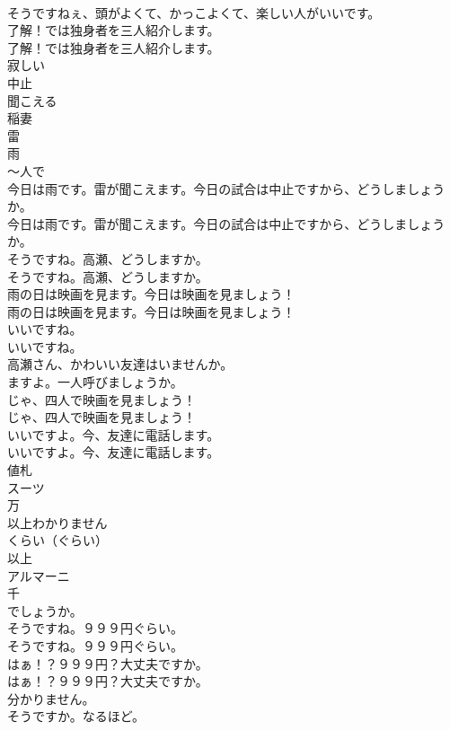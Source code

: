 \documentclass[8pt]{extreport}
\begin{document}
\begin{CJK}{UTF8}{min}
\\	そうですねぇ、頭がよくて、かっこよくて、楽しい人がいいです。 
\\	了解！では独身者を三人紹介します。	
\\	了解！では独身者を三人紹介します。 
\\	寂しい
\\	中止
\\	聞こえる
\\	稲妻
\\	雷
\\	雨
\\	～人で
\\	今日は雨です。雷が聞こえます。今日の試合は中止ですから、どうしましょうか。	
\\	今日は雨です。雷が聞こえます。今日の試合は中止ですから、どうしましょうか。 
\\	そうですね。高瀬、どうしますか。	
\\	そうですね。高瀬、どうしますか。 
\\	雨の日は映画を見ます。今日は映画を見ましょう！	
\\	雨の日は映画を見ます。今日は映画を見ましょう！ 
\\	いいですね。	
\\	いいですね。 
\\	高瀬さん、かわいい友達はいませんか。	
\\	ますよ。一人呼びましょうか。	
\\	じゃ、四人で映画を見ましょう！	
\\	じゃ、四人で映画を見ましょう！ 
\\	いいですよ。今、友達に電話します。	
\\	いいですよ。今、友達に電話します。 
\\	値札
\\	スーツ
\\	万
\\	以上わかりません
\\	くらい（ぐらい）
\\	以上
\\	アルマーニ
\\	千
\\	でしょうか。	
\\	そうですね。９９９円ぐらい。	
\\	そうですね。９９９円ぐらい。 
\\	はぁ！？９９９円？大丈夫ですか。	
\\	はぁ！？９９９円？大丈夫ですか。 
\\	分かりません。	
\\	そうですか。なるほど。	

\end{CJK}
\end{document}
